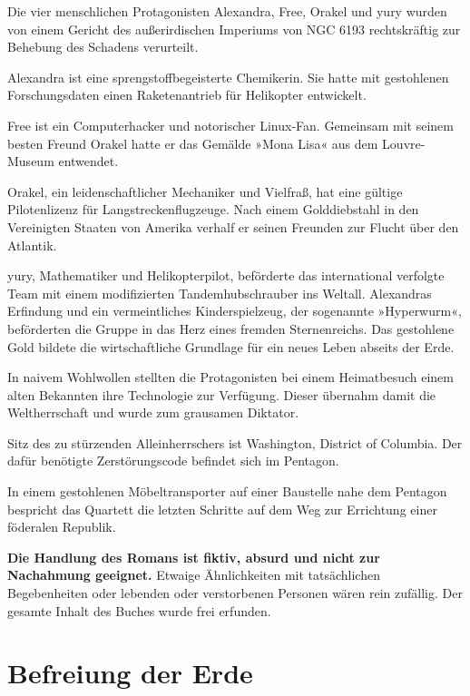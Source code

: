 \bigskip

\noindent Die vier menschlichen Protagonisten Alexandra, Free, Orakel und yury wurden von einem Gericht des außerirdischen Imperiums von NGC 6193 rechtskräftig zur Behebung des Schadens verurteilt.

Alexandra ist eine sprengstoffbegeisterte Chemikerin. Sie hatte mit gestohlenen Forschungsdaten einen Raketenantrieb für Helikopter entwickelt.

Free ist ein Computerhacker und notorischer Linux-Fan. Gemeinsam mit seinem besten Freund Orakel hatte er das Gemälde »Mona Lisa« aus dem Louvre-Museum entwendet.

Orakel, ein leidenschaftlicher Mechaniker und Vielfraß, hat eine gültige Pilotenlizenz für Langstreckenflugzeuge. Nach einem Golddiebstahl in den Vereinigten Staaten von Amerika verhalf er seinen Freunden zur Flucht über den Atlantik.

yury, Mathematiker und Helikopterpilot, beförderte das international verfolgte Team mit einem modifizierten Tandemhubschrauber ins Weltall. Alexandras Erfindung und ein vermeintliches Kinderspielzeug, der sogenannte »Hyperwurm«, beförderten die Gruppe in das Herz eines fremden Sternenreichs. Das gestohlene Gold bildete die wirtschaftliche Grundlage für ein neues Leben abseits der Erde.

\bigskip

\noindent In naivem Wohlwollen stellten die Protagonisten bei einem Heimatbesuch einem alten Bekannten ihre Technologie zur Verfügung. Dieser übernahm damit die Weltherrschaft und wurde zum grausamen Diktator.

Sitz des zu stürzenden Alleinherrschers ist Washington, District of Columbia. Der dafür benötigte Zerstörungscode befindet sich im Pentagon.

In einem gestohlenen Möbeltransporter auf einer Baustelle nahe dem Pentagon bespricht das Quartett die letzten Schritte auf dem Weg zur Errichtung einer föderalen Republik.

\bigskip

\noindent \textbf{Die Handlung des Romans ist fiktiv, absurd und nicht zur Nachahmung geeignet.} Etwaige Ähnlichkeiten mit tatsächlichen Begebenheiten oder lebenden oder verstorbenen Personen wären rein zufällig. Der gesamte Inhalt des Buches wurde frei erfunden.

\newpage

\part{Befreiung der Erde}

